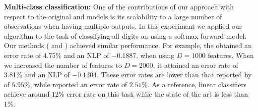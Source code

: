 \textbf{Multi-class classification:} One of the contributions of our approach with respect 
to the original \egp and \ugp models is its scalability to a large number of observations 
when having multiple outputs. In this experiment we applied our algorithm to the task
of classifying all digits on \mnist using a softmax forward model. Our methods (\eks 
and \uks) achieved similar performance. For 
example, the \eks obtained an error rate of $ 4.75\%$ and 
an NLP of $-0.1887$, when using $D=1000$ features. When we increased the number 
of features to 	$D=2000$, it attained an error rate of 3.81\% and an NLP of $-0.1304$.
These error rates  are lower than that reported by  \citet{gal-et-al-nips-2014} of $5.95\%$, 
while  \citet{dezfouli-bonilla-nips-2015} reported an error 
rate of $2.51\%$. As a reference, linear classifiers achieve around $12\%$ error rate on this 
task while the state of the art is less than $1\%$. 

 

 

 




